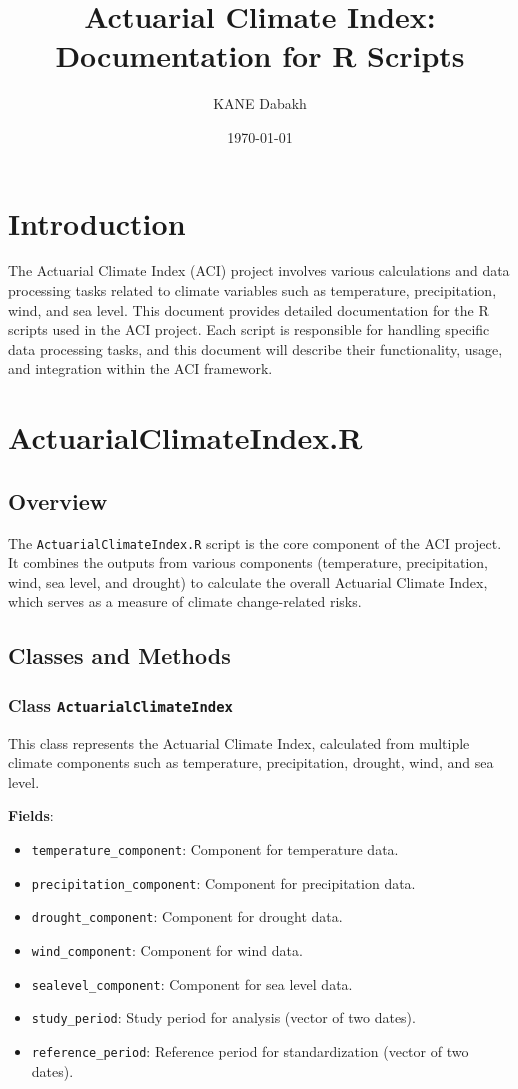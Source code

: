 \documentclass[a4paper,12pt]{article}
\title{Actuarial Climate Index: Documentation for R Scripts}
\author{KANE Dabakh}
\date{\today}
\begin{document}
\maketitle

\tableofcontents

\section{Introduction}
The Actuarial Climate Index (ACI) project involves various calculations and data processing tasks related to climate variables such as temperature, precipitation, wind, and sea level. This document provides detailed documentation for the R scripts used in the ACI project. Each script is responsible for handling specific data processing tasks, and this document will describe their functionality, usage, and integration within the ACI framework.

\section{ActuarialClimateIndex.R}
\label{sec:aci}

\subsection{Overview}
The \texttt{ActuarialClimateIndex.R} script is the core component of the ACI project. It combines the outputs from various components (temperature, precipitation, wind, sea level, and drought) to calculate the overall Actuarial Climate Index, which serves as a measure of climate change-related risks.

\subsection{Classes and Methods}

\subsubsection{Class \texttt{ActuarialClimateIndex}}
This class represents the Actuarial Climate Index, calculated from multiple climate components such as temperature, precipitation, drought, wind, and sea level.

\textbf{Fields}:
\begin{itemize}
    \item \texttt{temperature\_component}: Component for temperature data.
    \item \texttt{precipitation\_component}: Component for precipitation data.
    \item \texttt{drought\_component}: Component for drought data.
    \item \texttt{wind\_component}: Component for wind data.
    \item \texttt{sealevel\_component}: Component for sea level data.
    \item \texttt{study\_period}: Study period for analysis (vector of two dates).
    \item \texttt{reference\_period}: Reference period for standardization (vector of two dates).
\end{itemize}
\end{document}
